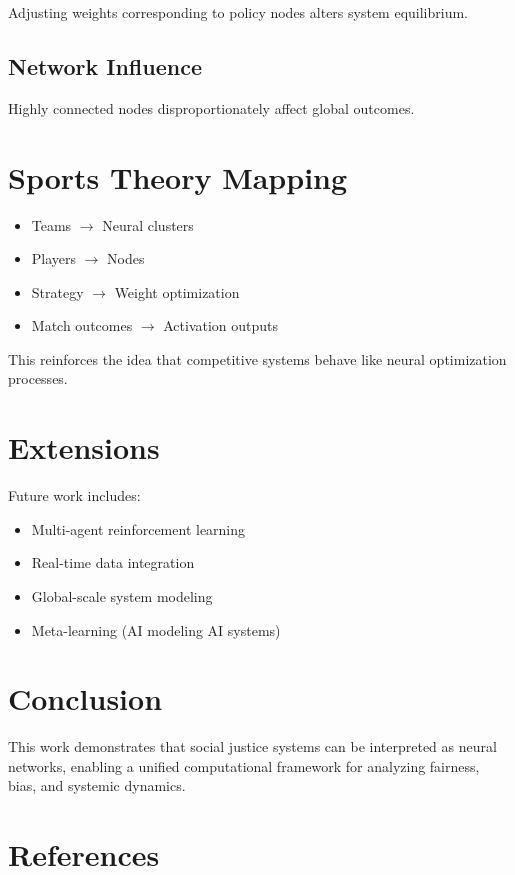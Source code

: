 \documentclass[12pt]{article}
\begin{document}
Adjusting weights corresponding to policy nodes alters system equilibrium.

\subsection*{Network Influence}

Highly connected nodes disproportionately affect global outcomes.

\section*{Sports Theory Mapping}

\begin{itemize}
\item Teams $\rightarrow$ Neural clusters
\item Players $\rightarrow$ Nodes
\item Strategy $\rightarrow$ Weight optimization
\item Match outcomes $\rightarrow$ Activation outputs
\end{itemize}

This reinforces the idea that competitive systems behave like neural optimization processes.

\section*{Extensions}

Future work includes:

\begin{itemize}
\item Multi-agent reinforcement learning
\item Real-time data integration
\item Global-scale system modeling
\item Meta-learning (AI modeling AI systems)
\end{itemize}

\section*{Conclusion}

This work demonstrates that social justice systems can be interpreted as neural networks, enabling a unified computational framework for analyzing fairness, bias, and systemic dynamics.

\section*{References}
\end{document}
